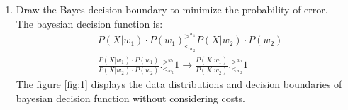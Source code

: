 \documentclass[12pt]{article}
\begin{document}
\begin{enumerate}
\item Draw the Bayes decision boundary to minimize the probability of error. \\

The bayesian decision function is:\\
\begin{align*}
&P(X | w_1) \cdot P(w_1)^{>^{w_1}}_{<_{w_2}}  P(X | w_2) \cdot P(w_2) \\
&\frac{P(X | w_1) \cdot P(w_1)}{P(X | w_2) \cdot P(w_2)} .^{>^{w_1}}_{<_{w_2}} 1\rightarrow\frac{P(X | w_1)}{P(X | w_2)} .^{>^{w_1}}_{<_{w_2}} 1
\end{align*}
The figure \ref{fig:1} displays the data distributions and decision boundaries of bayesian decision function without considering costs.


\end{enumerate}
\end{document}
